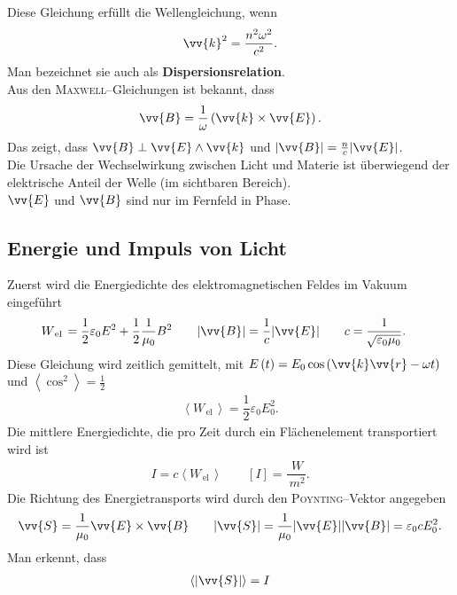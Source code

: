 \documentclass[a4paper,12pt]{article}
\numberwithin{equation}{section}
\begin{document}
Diese Gleichung erfüllt die Wellengleichung, wenn
\begin{align} 
        \vv{k}^2=\dfrac{n^2\omega ^2}{c^2}
.\end{align} 
Man bezeichnet sie auch als \textbf{Dispersionsrelation}.\\\indent
Aus den \textsc{Maxwell}--Gleichungen ist bekannt, dass
\begin{align} 
        \vv{B}=\dfrac{1}{\omega }\left(\vv{k}\times \vv{E}\right)
.\end{align} 
Das zeigt, dass $\vv{B}\perp \vv{E}\land \vv{k}$ und $|\vv{B}|=\tfrac{n}{c}|\vv{E}|$.\\\indent
Die Ursache der Wechselwirkung zwischen Licht und Materie ist überwiegend der elektrische Anteil der Welle (im sichtbaren Bereich).\\\indent
$\vv{E}$ und $\vv{B}$ sind nur im Fernfeld in Phase.

\subsection{Energie und Impuls von Licht}
Zuerst wird die Energiedichte des elektromagnetischen Feldes im Vakuum eingeführt
\begin{align} 
        W_{\,\text{el}\,}&=\dfrac{1}{2}\varepsilon _0E^2+\dfrac{1}{2}\dfrac{1}{\mu _0}B^2\qquad |\vv{B}|=\dfrac{1}{c}|\vv{E}|\qquad c=\dfrac{1}{\,\sqrt[]{\varepsilon _0\mu _0}}
.\end{align} 
Diese Gleichung wird zeitlich gemittelt, mit $E\left(t\right)=E_0\cos \left(\vv{k}\vv{r}-\omega t\right)$ und $\left\langle \cos ^2\right\rangle =\tfrac{1}{2}$
\begin{align} 
        \left\langle W_{\,\text{el}\,}\right\rangle =\dfrac{1}{2}\varepsilon _0E_0^2
.\end{align} 
Die mittlere Energiedichte, die pro Zeit durch ein Flächenelement transportiert wird ist
\begin{align} 
        I=c \left\langle W_{\,\text{el}\,}\right\rangle \qquad \left[I\right]=\dfrac{\SI{}{W}}{\SI{}{m^2}}
.\end{align} 
Die Richtung des Energietransports wird durch den \textsc{Poynting}--Vektor angegeben
\begin{align} 
        \vv{S}=\dfrac{1}{\mu _0}\vv{E}\times \vv{B}\qquad |\vv{S}|=\dfrac{1}{\mu _0}|\vv{E}||\vv{B}|=\varepsilon _0cE_0^2
.\end{align} 
Man erkennt, dass
\begin{align} 
        \left\langle |\vv{S}|\right\rangle =I
\end{align} 
\end{document}
